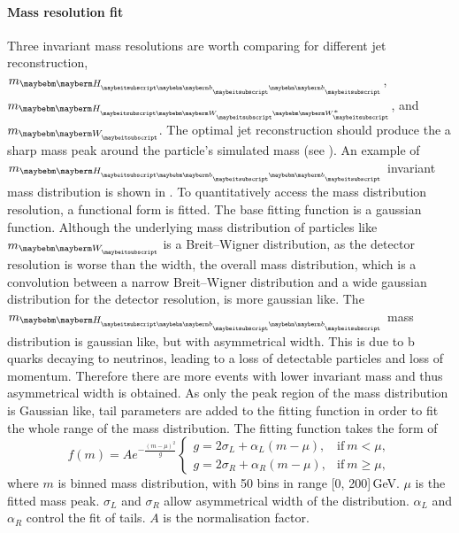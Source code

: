 \paragraph{Mass resolution fit}
Three invariant mass resolutions are worth comparing for different jet reconstruction,  $m_{\Hbb}$, $m_{\HWW}$, and $m_{\PW}$. The optimal jet reconstruction should produce the a sharp mass peak around the particle's simulated mass (see \Section{}). An example of $m_{\Hbb}$ invariant mass distribution is shown in . To quantitatively access the mass distribution resolution, a functional form is fitted. The base fitting function is a gaussian function. Although the underlying mass distribution of particles like $m_{\PW}$ is a Breit–Wigner distribution, as the detector resolution is worse than the \PW width, the overall mass distribution, which is a convolution between a narrow \PW  Breit–Wigner distribution and  a wide gaussian distribution for the detector resolution, is more gaussian like. The $m_{\Hbb}$  mass distribution is gaussian like, but with asymmetrical width. This is due to b quarks decaying to neutrinos, leading to a loss of detectable particles and loss of momentum. Therefore there are more events with lower invariant mass and thus asymmetrical width is obtained. As only the peak region of the mass distribution is Gaussian like, tail parameters are added to the fitting function in order to fit the whole range of the mass distribution. The fitting function takes the form of
\begin{equation}
f(m)=A e^{- \frac{(m - \mu)^2}{g}}
\begin{cases}
  g = 2\sigma_L + \alpha_L(m - \mu), & \text{if}\ m < \mu,\\
  g = 2\sigma_R + \alpha_R(m - \mu), & \text{if}\ m \geqslant \mu,
\end{cases}
\end{equation}
where $m$ is binned mass distribution, with 50 bins in range [0, 200]\,GeV. $\mu$ is the fitted mass peak. $\sigma_L$ and $\sigma_R$ allow asymmetrical width of the distribution. $\alpha_L$ and  $\alpha_R$  control the fit of tails.  $A$ is the normalisation factor.


